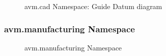 \begin{figure}[h!]
\caption{avm.cad Namespace: Guide Datum diagram}
\end{figure}

\subsubsection{avm.manufacturing Namespace}
\begin{figure}[h!]
\caption{avm.manufacturing Namespace}
\end{figure}

